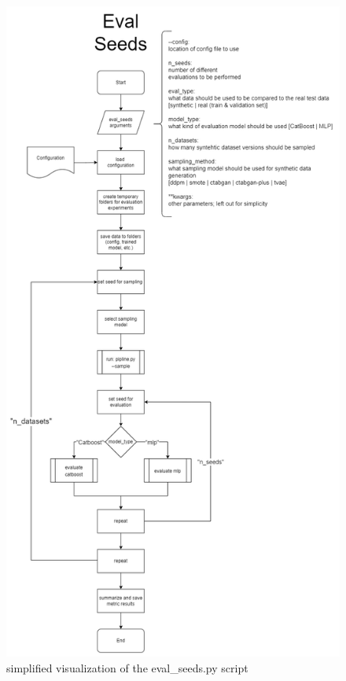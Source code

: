 \begin{figure}[H]
	\centering
	\includegraphics[height=0.9\textheight]{images/eval_seed-ORIGINAL.png}
	\caption[Evaluate Seeds]{simplified visualization of the eval\_seeds.py script}
\end{figure}

